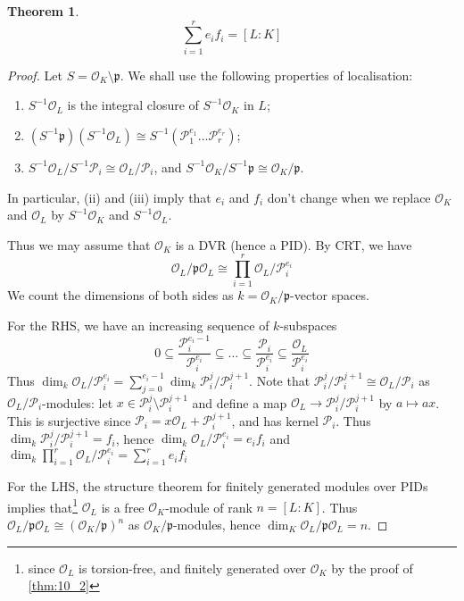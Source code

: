 \documentclass[11pt]{article}
\theoremstyle{definition}
\theoremstyle{plain}
\newtheorem{theorem}[definition]{Theorem}
\theoremstyle{remark}
\newcommand{\cO}{\mathcal{O}}
\newcommand{\cP}{\mathcal{P}}
\newcommand{\fp}{\mathfrak{p}}
\begin{document}
\begin{theorem}\label{thm:11_3}
    \begin{equation*}
        \sum_{i=1}^r e_i f_i = [L : K]
    \end{equation*}
\end{theorem}
\begin{proof}
    Let $S = \cO_K \setminus \fp$. We shall use the following properties of localisation:
    \begin{enumerate}
        \item $S^{-1} \cO_L$ is the integral closure of $S^{-1} \cO_K$ in $L$;
        \item $(S^{-1} \fp) (S^{-1} \cO_L) \cong S^{-1}(\cP_1^{e_1} \ldots \cP_r^{e_r})$;
        \item $S^{-1} \cO_L / S^{-1} \cP_i \cong \cO_L / \cP_i$, and $S^{-1} \cO_K / S^{-1} \fp \cong \cO_K / \fp$.
    \end{enumerate}
    In particular, (ii) and (iii) imply that $e_i$ and $f_i$ don't change when we replace $\cO_K$ and $\cO_L$ by $S^{-1}\cO_K$ and $S^{-1} \cO_L$.

    Thus we may assume that $\cO_K$ is a DVR (hence a PID). By CRT, we have
    \begin{equation*}
        \cO_L / \fp \cO_L \cong \prod_{i=1}^r \cO_L / \cP_i^{e_i}
    \end{equation*}
    We count the dimensions of both sides as $k = \cO_K / \fp$-vector spaces.

    For the RHS, we have an increasing sequence of $k$-subspaces
    \begin{equation*}
        0 \subseteq \frac{\cP_i^{e_i - 1}}{\cP_i^{e_i}} \subseteq \ldots \subseteq \frac{\cP_i}{\cP_i^{e_i}} \subseteq \frac{\cO_L}{\cP_i^{e_i}}
    \end{equation*}
    Thus $\dim_k \cO_L / \cP_i^{e_i} = \sum_{j=0}^{e_i - 1} \dim_k \cP_i^{j} / \cP_i^{j+1}$. Note that $\cP_i^{j} / \cP_i^{j+1} \cong \cO_L / \cP_i$ as $\cO_L / \cP_i$-modules: let $x \in \cP_i^j \setminus \cP_i^{j+1}$ and define a map $\cO_L \to \cP_i^j / \cP_i^{j+1}$ by $a \mapsto a x$. This is surjective since $\cP_i = x \cO_L + \cP_i^{j+1}$, and has kernel $\cP_i$. Thus $\dim_k \cP_i^j / \cP_i^{j+1} = f_i$, hence $\dim_k \cO_L / \cP_i^{e_i} = e_i f_i$ and $\dim_k \prod_{i=1}^r \cO_L / \cP_i^{e_i} = \sum_{i=1}^{r} e_i f_i$

    For the LHS, the structure theorem for finitely generated modules over PIDs implies that\footnote{since $\cO_L$ is torsion-free, and finitely generated over $\cO_K$ by the proof of \autoref{thm:10_2}} $\cO_L$ is a free $\cO_K$-module of rank $n = [L : K]$. Thus $\cO_L / \fp \cO_L \cong (\cO_K / \fp)^n$ as $\cO_K / \fp$-modules, hence $\dim_K \cO_L / \fp \cO_L = n$.
\end{proof}
\end{document}
